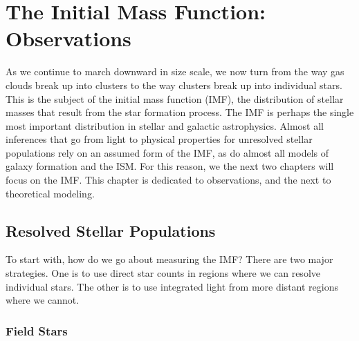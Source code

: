 \chapter{The Initial Mass Function: Observations}
\label{ch:imf_obs}



As we continue to march downward in size scale, we now turn from the way gas clouds break up into clusters to the way clusters break up into individual stars. This is the subject of the initial mass function (IMF), the distribution of stellar masses that result from the star formation process. The IMF is perhaps the single most important distribution in stellar and galactic astrophysics. Almost all inferences that go from light to physical properties for unresolved stellar populations rely on an assumed form of the IMF, as do almost all models of galaxy formation and the ISM. For this reason, we the next two chapters will focus on the IMF. This chapter is dedicated to observations, and the next to theoretical modeling.

\section{Resolved Stellar Populations}

To start with, how do we go about measuring the IMF? There are two major strategies. One is to use direct star counts in regions where we can resolve individual stars. The other is to use integrated light from more distant regions where we cannot.

\subsection{Field Stars}

